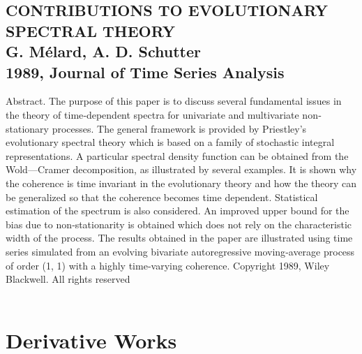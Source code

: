 \documentclass{article}
\begin{document}
\subsection{CONTRIBUTIONS TO EVOLUTIONARY SPECTRAL THEORY \\
G. Mélard, A. D. Schutter \\
1989, Journal of Time Series Analysis}
Abstract. The purpose of this paper is to discuss several fundamental issues in the theory of time‐dependent spectra for univariate and multivariate non‐stationary processes. The general framework is provided by Priestley's evolutionary spectral theory which is based on a family of stochastic integral representations. A particular spectral density function can be obtained from the Wold—Cramer decomposition, as illustrated by several examples. It is shown why the coherence is time invariant in the evolutionary theory and how the theory can be generalized so that the coherence becomes time dependent. Statistical estimation of the spectrum is also considered. An improved upper bound for the bias due to non‐stationarity is obtained which does not rely on the characteristic width of the process. The results obtained in the paper are illustrated using time series simulated from an evolving bivariate autoregressive moving‐average process of order (1, 1) with a highly time‐varying coherence. Copyright 1989, Wiley Blackwell. All rights reserved \\

\\

{\LARGE\section{Derivative Works}}
\end{document}
